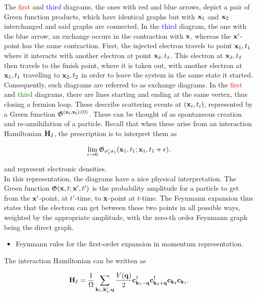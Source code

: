 The \textcolor{red}{first} and \textcolor{blue}{third} diagrams, the ones with red and blue arrows, depict a pair of Green function products, which have identical graphs but with ${\bf x}_1$ and ${\bf x}_2$ interchanged and said graphs are connected. In the \textcolor{blue}{third} diagram, the one with the blue arrow, an exchange occurs in the contraction with ${\bf x}$, whereas the ${\bf x'}$-point has the same contraction. First, the injected electron travels to point ${\bf x}_1, t_1$ where it interacts with another electron at point ${\bf x}_2, t_2$. This electron at ${\bf x}_2, t_2$ then travels to the finish point, where it is taken out, with another electron at ${\bf x}_1, t_1$ travelling to ${\bf x}_2, t_2$ in order to leave the system in the same state it started. Consequently, such diagrams are referred to as exchange diagrams. In the \textcolor{red}{first} and \textcolor{green}{third} diagrams, there are lines starting and ending at the same vertex, thus closing a fermion loop. These describe scattering events at $({\bf x}_i, t_i)$, represented by a Green function $\mathfrak{G}^{({\bf x_i, x_i});(0)}$. These can be thought of as spontaneous creation and re-annihilation of a particle. Recall that when these arise from an interaction Hamiltonian ${\bf H}_I$, the prescription is to interpret them as 

$$
    \lim_{\epsilon \rightarrow 0} \mathfrak{G}_{\sigma'_1 \sigma_1} ({\bf x}_1, t_1; {\bf x}_1, t_1+\epsilon),
$$

and represent electronic densities. \\

In this representation, the diagrams have a nice physical interpretation. The Green function $\mathfrak{G}({\bf x}, t; {\bf x}',t')$ is the probability amplitude for a particle to get from the ${\bf x}'$-point, at $t'$-time, to ${\bf x}$-point at $t$-time. The Feynmann expansion thus states that the electron can get between these two points in all possible ways, weighted by the appropriate amplitude, with the zero-th order Feynmann graph being the direct graph. \\

\begin{itemize}
    \item Feynmann rules for the first-order expansion in momentum representation.
\end{itemize}

The interaction Hamiltonian can be written as 

\begin{equation}
    {\bf H}_I = \frac{1}{\Omega}\sum_{{\bf k}_1, {\bf k}'_1, {\bf q}} \frac{V({\bf q)}}{2} {\bf c}_{{\bf k}_1 - {\bf q}}^\dagger {\bf c}_{{\bf k}_2 + {\bf q}}^\dagger {\bf c}_{{\bf k}_2}{\bf c}_{{\bf k}_1}.
\end{equation}

